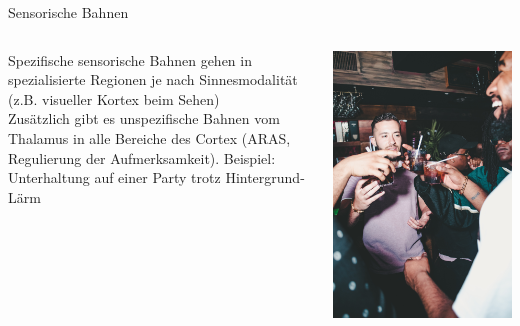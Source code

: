\documentclass[aspectratio=169]{beamer}
\begin{document}
\begin{frame}{Sensorische Bahnen}


\begin{columns}[c]

\begin{column}{7cm} 
Spezifische sensorische Bahnen gehen in spezialisierte Regionen je nach Sinnesmodalität (z.B. visueller Kortex beim Sehen)  \\[0.2 cm]



Zusätzlich gibt es unspezifische Bahnen vom Thalamus in alle Bereiche des Cortex (ARAS, Regulierung der Aufmerksamkeit). Beispiel: Unterhaltung auf einer Party trotz Hintergrund-Lärm

\end{column}

\begin{column}{5cm}
\begin{center}
    \includegraphics[width=\textwidth]{party.jpg}
\end{center}

\end{column}


\end{columns}







\end{frame}
\end{document}
